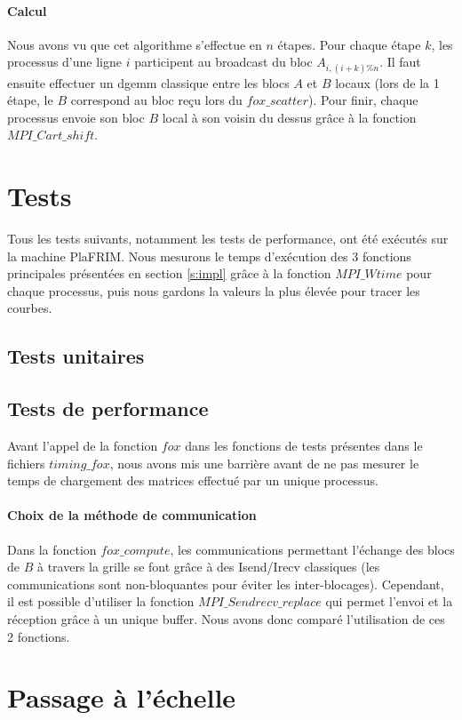\documentclass[12pt]{article}
\begin{document}
\paragraph{Calcul}
Nous avons vu que cet algorithme s'effectue en $n$ étapes. Pour chaque étape $k$, les processus d'une ligne $i$ participent au broadcast du bloc $A_{i,(i+k)\%n}$. Il faut ensuite effectuer un dgemm classique entre les blocs $A$ et $B$ locaux (lors de la 1\iere{} étape, le $B$ correspond au bloc reçu lors du $fox\_scatter$). Pour finir, chaque processus envoie son bloc $B$ local à son voisin du dessus grâce à la fonction $MPI\_Cart\_shift$.

\section{Tests}
Tous les tests suivants, notamment les tests de performance, ont été exécutés sur la machine PlaFRIM. Nous mesurons le temps d'exécution des 3 fonctions principales présentées en section \ref{s:impl} grâce à la fonction $MPI\_Wtime$ pour chaque processus, puis nous gardons la valeurs la plus élevée pour tracer les courbes.

\subsection{Tests unitaires}

\subsection{Tests de performance}
Avant l'appel de la fonction $fox$ dans les fonctions de tests présentes dans le fichiers $timing\_fox$, nous avons mis une barrière avant de ne pas mesurer le temps de chargement des matrices effectué par un unique processus.

\paragraph{Choix de la méthode de communication}
Dans la fonction $fox\_compute$, les communications permettant l'échange des blocs de $B$ à travers la grille se font grâce à des Isend/Irecv classiques (les communications sont non-bloquantes pour éviter les inter-blocages). Cependant, il est possible d'utiliser la fonction $MPI\_Sendrecv\_replace$ qui permet l'envoi et la réception grâce à un unique buffer. Nous avons donc comparé l'utilisation de ces 2 fonctions.


\section{Passage à l'échelle}
\end{document}
